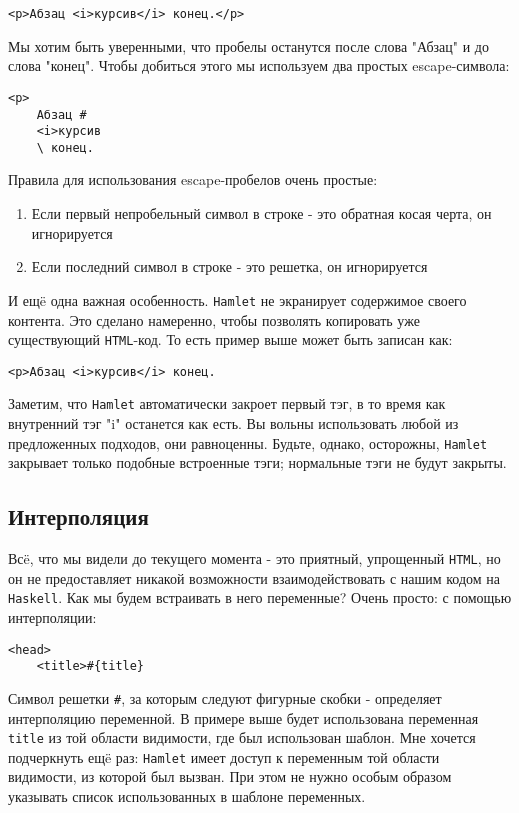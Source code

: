 \begin{lstlisting}
<p>Абзац <i>курсив</i> конец.</p>
\end{lstlisting}

Мы хотим быть уверенными, что пробелы останутся после слова "Абзац" и
до слова "конец". Чтобы добиться этого мы используем два простых escape-символа:

\begin{lstlisting}
<p>
    Абзац #
    <i>курсив
    \ конец.
\end{lstlisting}

Правила для использования escape-пробелов очень простые:
\begin{enumerate}
\item Если первый непробельный символ в строке - это обратная косая черта,
он игнорируется
\item Если последний символ в строке - это решетка, он игнорируется
\end{enumerate}

И ещë одна важная особенность. \texttt{Hamlet} не экранирует содержимое своего контента.
Это сделано намеренно, чтобы позволять копировать уже существующий \texttt{HTML}-код.
То есть пример выше может быть записан как:
\begin{lstlisting}
<p>Абзац <i>курсив</i> конец.
\end{lstlisting}

Заметим, что \texttt{Hamlet} автоматически закроет первый тэг, в то время как внутренний
тэг "i" останется как есть. Вы вольны использовать любой из предложенных
подходов, они равноценны. Будьте, однако, осторожны, \texttt{Hamlet} закрывает только
подобные встроенные тэги; нормальные тэги не будут закрыты.

\subsection{Интерполяция}
Всë, что мы видели до текущего момента - это приятный, упрощенный \texttt{HTML}, но он
не предоставляет никакой возможности взаимодействовать с нашим кодом на \texttt{Haskell}.
Как мы будем встраивать в него переменные? Очень просто: с помощью интерполяции:

\begin{lstlisting}
<head>
    <title>#{title}
\end{lstlisting}

Символ решетки \verb'#', за которым следуют фигурные скобки - определяет интерполяцию
переменной. В примере выше будет использована переменная \lstinline!title! из той
области видимости, где был использован шаблон. Мне хочется подчеркнуть ещë раз:
\texttt{Hamlet} имеет доступ к переменным той области видимости, из которой был вызван.
При этом не нужно особым образом указывать список использованных в шаблоне переменных.

